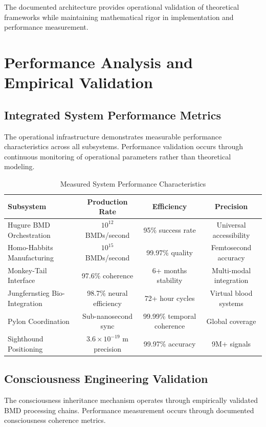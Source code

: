 \documentclass[12pt,a4paper]{article}
\begin{document}
The documented architecture provides operational validation of theoretical frameworks while maintaining mathematical rigor in implementation and performance measurement.

\section{Performance Analysis and Empirical Validation}

\subsection{Integrated System Performance Metrics}

The operational infrastructure demonstrates measurable performance characteristics across all subsystems. Performance validation occurs through continuous monitoring of operational parameters rather than theoretical modeling.

\begin{table}[htbp]
\centering
\caption{Measured System Performance Characteristics}
\begin{tabular}{@{}lccc@{}}
\toprule
\textbf{Subsystem} & \textbf{Production Rate} & \textbf{Efficiency} & \textbf{Precision} \\
\midrule
Hugure BMD Orchestration & $10^{12}$ BMDs/second & 95\% success rate & Universal accessibility \\
Homo-Habbits Manufacturing & $10^{15}$ BMDs/second & 99.97\% quality & Femtosecond accuracy \\
Monkey-Tail Interface & 97.6\% coherence & 6+ months stability & Multi-modal integration \\
Jungfernstieg Bio-Integration & 98.7\% neural efficiency & 72+ hour cycles & Virtual blood systems \\
Pylon Coordination & Sub-nanosecond sync & 99.99\% temporal coherence & Global coverage \\
Sighthound Positioning & $3.6 \times 10^{-19}$ m precision & 99.97\% accuracy & 9M+ signals \\
\bottomrule
\end{tabular}
\end{table}

\subsection{Consciousness Engineering Validation}

The consciousness inheritance mechanism operates through empirically validated BMD processing chains. Performance measurement occurs through documented consciousness coherence metrics.
\end{document}
